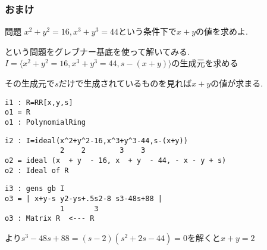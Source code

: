 \documentclass[dvipdfmx,22pt,notheorems]{beamer}
\theoremstyle{definition}
\begin{document}
\begin{frame}
	\frametitle{おまけ}
	\begin{block}{問題}
	$x^2+y^2=16,x^3+y^3=44$という条件下で$x+y$の値を求めよ.
	\end{block}
	という問題をグレブナー基底を使って解いてみる.\\
	$I=\langle x^2+y^2=16,x^3+y^3=44,s-(x+y) \rangle$の生成元を求める\par
	その生成元で$s$だけで生成されているものを見れば$x+y$の値が求まる.
\end{frame}

\begin{frame}[containsverbatim]
\begin{verbatim}
i1 : R=RR[x,y,s]
o1 = R
o1 : PolynomialRing 
\end{verbatim}
\begin{verbatim}
i2 : I=ideal(x^2+y^2-16,x^3+y^3-44,s-(x+y))
             2    2        3    3
o2 = ideal (x  + y  - 16, x  + y  - 44, - x - y + s)
o2 : Ideal of R
\end{verbatim}
\begin{verbatim}
i3 : gens gb I
o3 = | x+y-s y2-ys+.5s2-8 s3-48s+88 |
             1       3
o3 : Matrix R  <--- R
\end{verbatim}
より$s^3-48s+88 = (s-2)(s^2+2s-44)=0$を解くと$x+y=2$
\end{frame}
\end{document}
